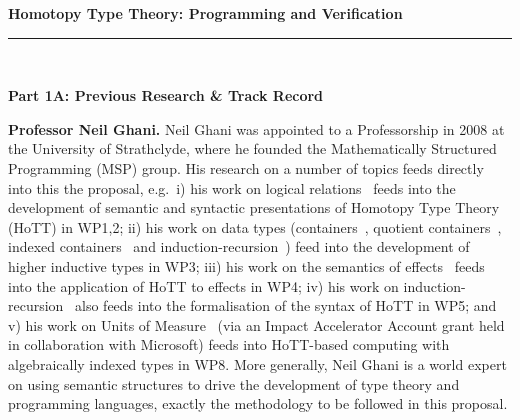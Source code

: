 \documentclass[a4paper,11pt]{article}
\newcommand{\eg}{{e.g.}\ }
\begin{document}
\thispagestyle{plain}
\begin{center}
  {\Large {\bf Homotopy Type Theory: Programming and Verification}}\\[1ex] 
\vspace*{-0.1in}

  \rule{140mm}{.5mm}\\[2ex]
\end{center}

\noindent
{\bf \Large Part 1A: Previous Research \& Track Record}

\textbf{Professor Neil Ghani.} Neil Ghani was appointed to a
Professorship in 2008 at the University of Strathclyde, where he
founded the Mathematically Structured Programming (MSP) group. His
research on a number of topics feeds directly into this the proposal,
\eg i) his work on logical relations~\cite{neil2014relParamDep} feeds
into the development of semantic and syntactic presentations of
Homotopy Type Theory (HoTT) in WP1,2; ii) his work on data types
(containers~\cite{alti:cont-tcs}, quotient
containers~\cite{alti:mpc04}, indexed
containers~\cite{altenkirchGhaniHancockMcBrideMorris:indexedContainers}
and induction-recursion~\cite{ghani:fibredIR})
feed into the development of higher inductive types in WP3; iii) his
work on the semantics of effects~\cite{atkeyGhaniJacobsJohann:effects}
feeds into the application of HoTT to effects in WP4; iv) his work on
induction-recursion~\cite{ghani:fibredIR} also feeds into the
formalisation of the syntax of HoTT in WP5; and v) his work on Units
of Measure~\cite{uom} (via an Impact Accelerator Account grant held in
collaboration with Microsoft) feeds into HoTT-based computing with
algebraically indexed types in WP8. More generally, Neil Ghani is a
world expert on using semantic structures to drive the development of
type theory and programming languages, exactly the methodology to be
followed in this proposal.
\end{document}
